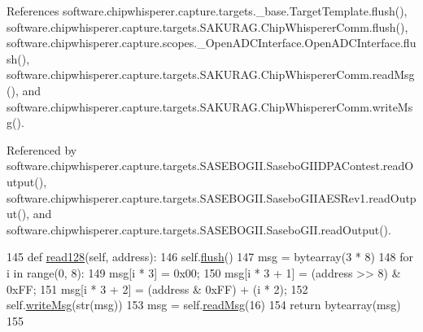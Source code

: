 References software.\+chipwhisperer.\+capture.\+targets.\+\_\+base.\+Target\+Template.\+flush(), software.\+chipwhisperer.\+capture.\+targets.\+S\+A\+K\+U\+R\+A\+G.\+Chip\+Whisperer\+Comm.\+flush(), software.\+chipwhisperer.\+capture.\+scopes.\+\_\+\+Open\+A\+D\+C\+Interface.\+Open\+A\+D\+C\+Interface.\+flush(), software.\+chipwhisperer.\+capture.\+targets.\+S\+A\+K\+U\+R\+A\+G.\+Chip\+Whisperer\+Comm.\+read\+Msg(), and software.\+chipwhisperer.\+capture.\+targets.\+S\+A\+K\+U\+R\+A\+G.\+Chip\+Whisperer\+Comm.\+write\+Msg().



Referenced by software.\+chipwhisperer.\+capture.\+targets.\+S\+A\+S\+E\+B\+O\+G\+I\+I.\+Sasebo\+G\+I\+I\+D\+P\+A\+Contest.\+read\+Output(), software.\+chipwhisperer.\+capture.\+targets.\+S\+A\+S\+E\+B\+O\+G\+I\+I.\+Sasebo\+G\+I\+I\+A\+E\+S\+Rev1.\+read\+Output(), and software.\+chipwhisperer.\+capture.\+targets.\+S\+A\+S\+E\+B\+O\+G\+I\+I.\+Sasebo\+G\+I\+I.\+read\+Output().


\begin{DoxyCode}
145     \textcolor{keyword}{def }\hyperlink{classsoftware_1_1chipwhisperer_1_1capture_1_1targets_1_1SAKURAG_1_1ChipWhispererComm_ae32d114745b77e88b95297ef270a8afd}{read128}(self, address):
146         self.\hyperlink{classsoftware_1_1chipwhisperer_1_1capture_1_1targets_1_1SAKURAG_1_1ChipWhispererComm_a7d0dfb167255f9298cbc3f4e9e1ea2f0}{flush}()
147         msg = bytearray(3 * 8)
148         \textcolor{keywordflow}{for} i \textcolor{keywordflow}{in} range(0, 8):
149             msg[i * 3] = 0x00;
150             msg[i * 3 + 1] = (address >> 8) & 0xFF;
151             msg[i * 3 + 2] = (address & 0xFF) + (i * 2);
152         self.\hyperlink{classsoftware_1_1chipwhisperer_1_1capture_1_1targets_1_1SAKURAG_1_1ChipWhispererComm_ab1bfde1b19eefaefd3f18ee4178c982c}{writeMsg}(str(msg))
153         msg = self.\hyperlink{classsoftware_1_1chipwhisperer_1_1capture_1_1targets_1_1SAKURAG_1_1ChipWhispererComm_a8bbb21f0e60f4f8787041ad65b9029e9}{readMsg}(16)
154         \textcolor{keywordflow}{return} bytearray(msg)
155 
\end{DoxyCode}
\hypertarget{classsoftware_1_1chipwhisperer_1_1capture_1_1targets_1_1SAKURAG_1_1ChipWhispererComm_a8bbb21f0e60f4f8787041ad65b9029e9}{}
